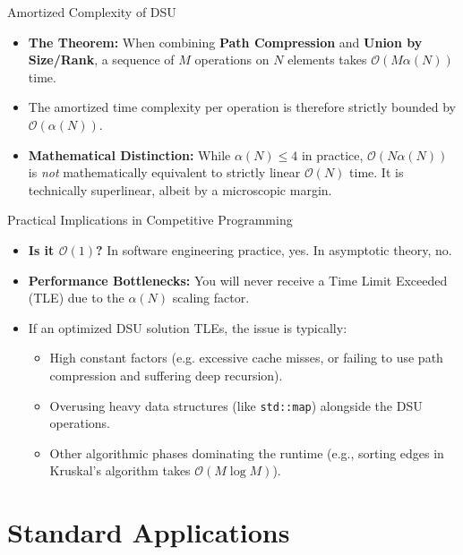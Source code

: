 \documentclass{beamer}
\begin{document}
\begin{frame}{Amortized Complexity of DSU}
    \begin{itemize}
        \item \textbf{The Theorem:} When combining \textbf{Path Compression} and \textbf{Union by Size/Rank}, a sequence of $M$ operations on $N$ elements takes $\mathcal{O}(M \alpha(N))$ time.
        \item The amortized time complexity per operation is therefore strictly bounded by $\mathcal{O}(\alpha(N))$.
        \item \textbf{Mathematical Distinction:} While $\alpha(N) \le 4$ in practice, $\mathcal{O}(N \alpha(N))$ is \textit{not} mathematically equivalent to strictly linear $\mathcal{O}(N)$ time. It is technically superlinear, albeit by a microscopic margin.
    \end{itemize}
\end{frame}

\begin{frame}{Practical Implications in Competitive Programming}
    \begin{itemize}
        \item \textbf{Is it $\mathcal{O}(1)$?} In software engineering practice, yes. In asymptotic theory, no.
        \item \textbf{Performance Bottlenecks:} You will never receive a Time Limit Exceeded (TLE) due to the $\alpha(N)$ scaling factor.
        \item If an optimized DSU solution TLEs, the issue is typically:
        \begin{itemize}
            \item High constant factors (e.g. excessive cache misses, or failing to use path compression and suffering deep recursion).
            \item Overusing heavy data structures (like \texttt{std::map}) alongside the DSU operations.
            \item Other algorithmic phases dominating the runtime (e.g., sorting edges in Kruskal's algorithm takes $\mathcal{O}(M \log M)$).
        \end{itemize}
    \end{itemize}
\end{frame}

\section{Standard Applications}
\end{document}
